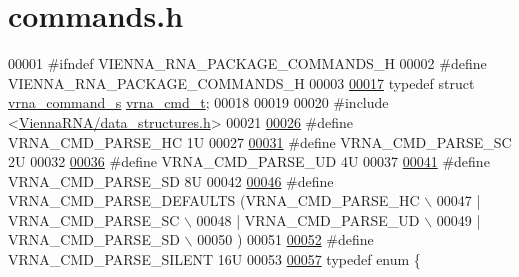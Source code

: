\hypertarget{commands_8h_source}{}\section{commands.\+h}
\label{commands_8h_source}

\begin{DoxyCode}
00001 \textcolor{preprocessor}{#ifndef VIENNA\_RNA\_PACKAGE\_COMMANDS\_H}
00002 \textcolor{preprocessor}{#define VIENNA\_RNA\_PACKAGE\_COMMANDS\_H}
00003 
\mbox{\hyperlink{group__file__utils_ga92cb3b5952352b103bcb32e5a99e0e5a}{00017}} \textcolor{keyword}{typedef} \textcolor{keyword}{struct }\mbox{\hyperlink{group__file__utils_structvrna__command__s}{vrna\_command\_s}} \mbox{\hyperlink{group__file__utils_structvrna__command__s}{vrna\_cmd\_t}};
00018 
00019 
00020 \textcolor{preprocessor}{#include <\mbox{\hyperlink{data__structures_8h}{ViennaRNA/data\_structures.h}}>}
00021 
\mbox{\hyperlink{group__file__utils_gac54dec838d7b6bebd5df85f71702d324}{00026}} \textcolor{preprocessor}{#define VRNA\_CMD\_PARSE\_HC      1U}
00027 
\mbox{\hyperlink{group__file__utils_ga8cad3c1f83e6f149829c49a186a83e21}{00031}} \textcolor{preprocessor}{#define VRNA\_CMD\_PARSE\_SC      2U}
00032 
\mbox{\hyperlink{group__file__utils_ga6c6409780698826b04ebfed9151d7649}{00036}} \textcolor{preprocessor}{#define VRNA\_CMD\_PARSE\_UD      4U}
00037 
\mbox{\hyperlink{group__file__utils_gaf5e20210173cdb83bf70256a454f284b}{00041}} \textcolor{preprocessor}{#define VRNA\_CMD\_PARSE\_SD      8U}
00042 
\mbox{\hyperlink{group__file__utils_ga0a6c88e21e366dca14958d69cd024008}{00046}} \textcolor{preprocessor}{#define VRNA\_CMD\_PARSE\_DEFAULTS (VRNA\_CMD\_PARSE\_HC \(\backslash\)}
00047 \textcolor{preprocessor}{                                 | VRNA\_CMD\_PARSE\_SC \(\backslash\)}
00048 \textcolor{preprocessor}{                                 | VRNA\_CMD\_PARSE\_UD \(\backslash\)}
00049 \textcolor{preprocessor}{                                 | VRNA\_CMD\_PARSE\_SD \(\backslash\)}
00050 \textcolor{preprocessor}{                                 )}
00051 
\mbox{\hyperlink{group__file__utils_ga8d6c5d6d2936464a11f542b843bd1610}{00052}} \textcolor{preprocessor}{#define VRNA\_CMD\_PARSE\_SILENT   16U}
00053 
\mbox{\hyperlink{group__file__utils_ga2ea3e452bf3b3f3ca513b3b081a86137}{00057}} \textcolor{keyword}{typedef} \textcolor{keyword}{enum} \{

\end{DoxyCode}
